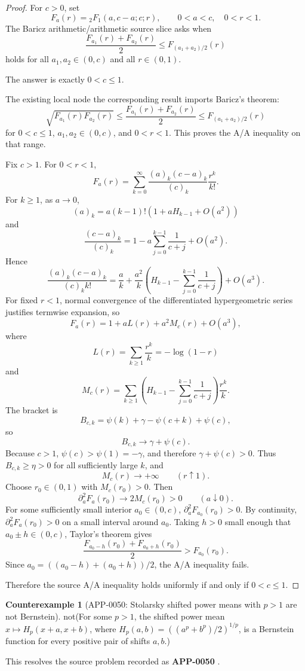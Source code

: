 \documentclass[11pt]{article}
\numberwithin{equation}{section}
\theoremstyle{definition}
\newtheorem{counterexample}[theorem]{Counterexample}
\theoremstyle{remark}
\newcommand{\1}{\mathbf 1}
\begin{document}
\begin{proof}
For \(c>0\), set
\[
F_a(r)={}_2F_1(a,c-a;c;r),\qquad 0<a<c,\quad 0<r<1.
\]
The Baricz arithmetic/arithmetic source slice asks when
\[
\frac{F_{a_1}(r)+F_{a_2}(r)}2\le F_{(a_1+a_2)/2}(r)
\]
holds for all \(a_1,a_2\in(0,c)\) and all \(r\in(0,1)\).

The answer is exactly \(0<c\le1\).

The existing local node the corresponding result imports Baricz's theorem:
\[
\sqrt{F_{a_1}(r)F_{a_2}(r)}
\le
\frac{F_{a_1}(r)+F_{a_2}(r)}2
\le
F_{(a_1+a_2)/2}(r)
\]
for \(0<c\le1\), \(a_1,a_2\in(0,c)\), and \(0<r<1\). This proves the A/A inequality on that range.

Fix \(c>1\). For \(0<r<1\),
\[
F_a(r)=\sum_{k=0}^{\infty}
\frac{(a)_k(c-a)_k}{(c)_k}\frac{r^k}{k!}.
\]
For \(k\ge1\), as \(a\to0\),
\[
(a)_k=a(k-1)!\left(1+aH_{k-1}+O(a^2)\right)
\]
and
\[
\frac{(c-a)_k}{(c)_k}
=
1-a\sum_{j=0}^{k-1}\frac1{c+j}+O(a^2).
\]
Hence
\[
\frac{(a)_k(c-a)_k}{(c)_k k!}
=
\frac ak+\frac{a^2}{k}
\left(
H_{k-1}-\sum_{j=0}^{k-1}\frac1{c+j}
\right)
 +O(a^3).
\]
For fixed \(r<1\), normal convergence of the differentiated hypergeometric series justifies termwise expansion, so
\[
F_a(r)=1+aL(r)+a^2M_c(r)+O(a^3),
\]
where
\[
L(r)=\sum_{k\ge1}\frac{r^k}{k}=-\log(1-r)
\]
and
\[
M_c(r)=
\sum_{k\ge1}
\left(
H_{k-1}-\sum_{j=0}^{k-1}\frac1{c+j}
\right)\frac{r^k}{k}.
\]
The bracket is
\[
B_{c,k}
=
\psi(k)+\gamma-\psi(c+k)+\psi(c),
\]
so
\[
B_{c,k}\to \gamma+\psi(c).
\]
Because \(c>1\), \(\psi(c)>\psi(1)=-\gamma\), and therefore \(\gamma+\psi(c)>0\). Thus \(B_{c,k}\ge\eta>0\) for all sufficiently large \(k\), and
\[
M_c(r)\to+\infty\qquad (r\uparrow1).
\]
Choose \(r_0\in(0,1)\) with \(M_c(r_0)>0\). Then
\[
\partial_a^2F_a(r_0)\to 2M_c(r_0)>0
\qquad (a\downarrow0).
\]
For some sufficiently small interior \(a_0\in(0,c)\), \(\partial_a^2F_{a_0}(r_0)>0\). By continuity, \(\partial_a^2F_a(r_0)>0\) on a small interval around \(a_0\). Taking \(h>0\) small enough that \(a_0\pm h\in(0,c)\), Taylor's theorem gives
\[
\frac{F_{a_0-h}(r_0)+F_{a_0+h}(r_0)}2>F_{a_0}(r_0).
\]
Since \(a_0=((a_0-h)+(a_0+h))/2\), the A/A inequality fails.

Therefore the source A/A inequality holds uniformly if and only if \(0<c\le1\).
\end{proof}

\begin{counterexample}[APP-0050: Stolarsky shifted power means with \(p>1\) are not Bernstein]
\label{res:not-stolarsky-power-mean-pgt1-bernstein-all-shifts}
not(For some \(p>1\), the shifted power mean \(x\mapsto H_p(x+a,x+b)\), where \(H_p(a,b)=((a^p+b^p)/2)^{1/p}\), is a Bernstein function for every positive pair of shifts \(a,b\).)

This resolves the source problem recorded as \textbf{APP-0050} \cite{app-app-0050-source}.
\end{counterexample}
\end{document}
